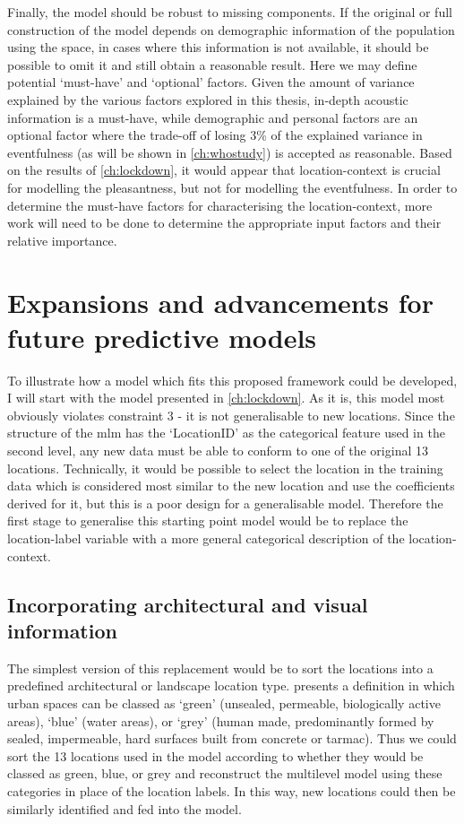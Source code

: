 Finally, the model should be robust to missing components. If the original or full construction of the model depends on demographic information of the population using the space, in cases where this information is not available, it should be possible to omit it and still obtain a reasonable result. Here we may define potential `must-have’ and `optional’ factors. Given the amount of variance explained by the various factors explored in this thesis, in-depth acoustic information is a must-have, while demographic and personal factors are an optional factor where the trade-off of losing 3\% of the explained variance in eventfulness (as will be shown in \cref{ch:whostudy}) is accepted as reasonable. Based on the results of \cref{ch:lockdown}, it would appear that location-context is crucial for modelling the pleasantness, but not for modelling the eventfulness. In order to determine the must-have factors for characterising the location-context, more work will need to be done to determine the appropriate input factors and their relative importance. 

\section{Expansions and advancements for future predictive models}

To illustrate how a model which fits this proposed framework could be developed, I will start with the model presented in \cref{ch:lockdown}. As it is, this model most obviously violates constraint 3 - it is not generalisable to new locations. Since the structure of the \gls{mlm} has the `LocationID' as the categorical feature used in the second level, any new data must be able to conform to one of the original 13 locations. Technically, it would be possible to select the location in the training data which is considered most similar to the new location and use the coefficients derived for it, but this is a poor design for a generalisable model. Therefore the first stage to generalise this starting point model would be to replace the location-label variable with a more general categorical description of the location-context.

\subsection{Incorporating architectural and visual information}

The simplest version of this replacement would be to sort the locations into a predefined architectural or landscape location type. \citet{Suligowski2021Quantity} presents a definition in which urban spaces can be classed as `green' (unsealed, permeable, biologically active areas), `blue' (water areas), or `grey' (human made, predominantly formed by sealed, impermeable, hard surfaces built from concrete or tarmac). Thus we could sort the 13 locations used in the model according to whether they would be classed as green, blue, or grey and reconstruct the multilevel model using these categories in place of the location labels. In this way, new locations could then be similarly identified and fed into the model.

